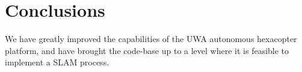 \documentclass[a4paper, 11pt, titlepage]{article}
\begin{document}
\section{Conclusions}
	We have greatly improved the capabilities of the UWA autonomous hexacopter platform, and have brought the code-base up to a level where it is feasible to implement a SLAM process.





\renewcommand{\refname}{References}


%


\begin{appendices}
%    

\end{appendices}

	
\end{document}
